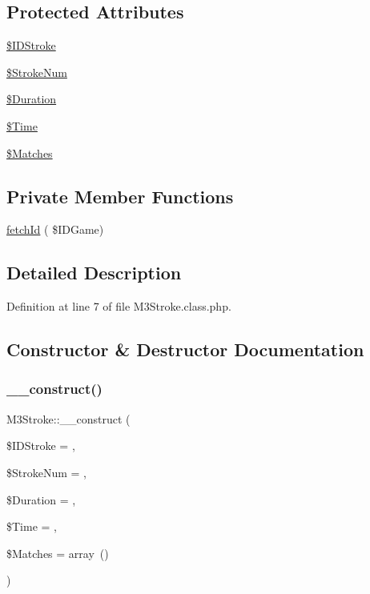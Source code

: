 \subsection*{Protected Attributes}
\begin{DoxyCompactItemize}
\item 
\hyperlink{class_m3_stroke_a2315c5feec59a24abc5e0e7b04511897}{\$\+I\+D\+Stroke}
\item 
\hyperlink{class_m3_stroke_ae207067a9e94214c11cbb54dd743cb0a}{\$\+Stroke\+Num}
\item 
\hyperlink{class_m3_stroke_a04ed9992b36359efc4a199525e58e13f}{\$\+Duration}
\item 
\hyperlink{class_m3_stroke_ad96b688792fa3fd78fe3ad3fc14cba14}{\$\+Time}
\item 
\hyperlink{class_m3_stroke_ab59a25a76c0ac9b3dbea0135e303f2cf}{\$\+Matches}
\end{DoxyCompactItemize}
\subsection*{Private Member Functions}
\begin{DoxyCompactItemize}
\item 
\hyperlink{class_m3_stroke_a576c40bd23077ab7457fb7d368c29d9f}{fetch\+Id} ( \$I\+D\+Game)
\end{DoxyCompactItemize}


\subsection{Detailed Description}


Definition at line 7 of file M3\+Stroke.\+class.\+php.



\subsection{Constructor \& Destructor Documentation}
\mbox{\label{class_m3_stroke_ad6d724aa8f899efc6a413277454bb2ec}} 
\subsubsection{\texorpdfstring{\+\_\+\+\_\+construct()}{\_\_construct()}}
{\footnotesize\ttfamily M3\+Stroke\+::\+\_\+\+\_\+construct (\begin{DoxyParamCaption}\item[{}]{\$\+I\+D\+Stroke = {},  }\item[{}]{\$\+Stroke\+Num = {},  }\item[{}]{\$\+Duration = {},  }\item[{}]{\$\+Time = {},  }\item[{}]{\$\+Matches = {\ttfamily array~()} }\end{DoxyParamCaption})}



